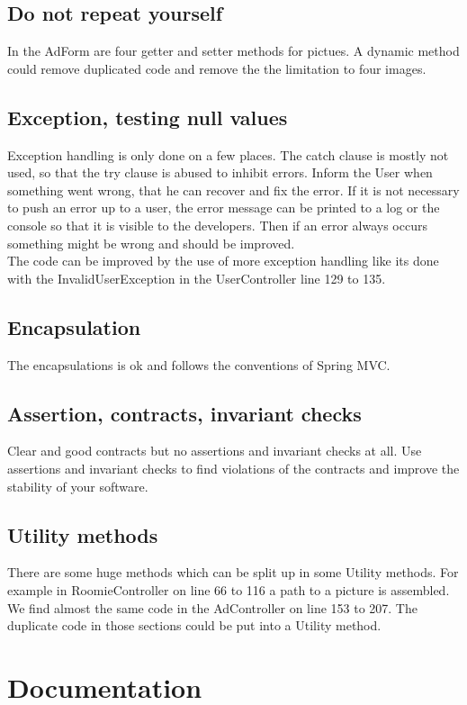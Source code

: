 \documentclass{scrreprt}
\begin{document}
\subsection{Do not repeat yourself}
In the AdForm are four getter and setter methods for pictues. A dynamic method could remove duplicated code and remove the the limitation to four images. 
\subsection{Exception, testing null values}
Exception handling is only done on a few places. The catch clause is mostly not used, so that the try clause is abused to inhibit errors. 
Inform the User when something went wrong, that he can recover and fix the error. If it is not necessary to push an error up to a user, the error message can be printed to a log or the console so that it is visible to the developers. Then if an error always occurs something might be wrong and should be improved. \\
The code can be improved by the use of more exception handling like its done with the InvalidUserException in the UserController line 129 to 135.

\subsection{Encapsulation}
The encapsulations is ok and follows the conventions of Spring MVC. 

\subsection{Assertion, contracts, invariant checks}
Clear and good contracts but no assertions and invariant checks at all. Use assertions and invariant checks to find violations of the contracts and improve the stability of your software.

\subsection{Utility methods}
There are some huge methods which can be split up in some Utility methods. 
For example in RoomieController on line 66 to 116 a path to a picture is assembled. We find almost the same code in the AdController on line 153 to 207. The duplicate code in those sections could be put into a Utility method.


\section{Documentation}
\end{document}
